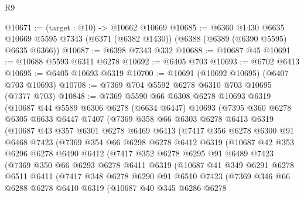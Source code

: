\begin{lexlean}{R9}
\begin{coremodule}
@10671 := (target : @10) -> @10662 @10669
@10685 := @6360
    @1430
    @6635
    @10669
    @5595
    @7343
    (@6371 (@6382 @1430))
    (@6388 (@6389 (@6390 @5595) @6635 @6366))
@10687 := @6398 @7343 @332
@10688 := @10687 @45
@10691 := @10688 @5593 @6311 @6278
@10692 := @6405 @703
@10693 := @6702 @6413
@10695 := @6405 @10693 @6319
@10700 := @10691 (@10692 @10695) (@6407 @703 @10693)
@10708 := @7369 @704 @5592 @6278 @6310 @703 @10695 (@7377 @703)
@10848 := @7369
    @5590
    @66
    @6308
    @6278
    @10693
    @6319
    (@10687
      @44
      @5589
      @6306
      @6278
      (@6634 @6447)
      @10693
      (@7395
        @360
        @6278
        @6305
        @6633
        @6447
        @7407
        (@7369
          @358
          @66
          @6303
          @6278
          @6413
          @6319
          (@10687
            @43
            @357
            @6301
            @6278
            @6469
            @6413
            (@7417
              @356
              @6278
              @6300
              @91
              @6468
              @7423
              (@7369
                @354
                @66
                @6298
                @6278
                @6412
                @6319
                (@10687
                  @42
                  @353
                  @6296
                  @6278
                  @6490
                  @6412
                  (@7417
                    @352
                    @6278
                    @6295
                    @91
                    @6489
                    @7423
                    (@7369
                      @350
                      @66
                      @6293
                      @6278
                      @6411
                      @6319
                      (@10687
                        @41
                        @349
                        @6291
                        @6278
                        @6511
                        @6411
                        (@7417
                          @348
                          @6278
                          @6290
                          @91
                          @6510
                          @7423
                          (@7369
                            @346
                            @66
                            @6288
                            @6278
                            @6410
                            @6319
                            (@10687
                              @40
                              @345
                              @6286
                              @6278

\end{coremodule}
\end{lexlean}
